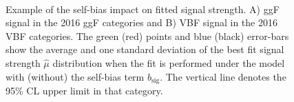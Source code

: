 \begin{figure}[ht!]
\captionsetup[subfigure]{justification=centering}
\centering
{}
\\
\caption[Example of the self-bias impact on fitted signal strength]{Example of the self-bias impact on fitted signal strength. A) ggF signal in the 2016 ggF categories and B) VBF signal in the 2016 VBF categories. The green (red) points and blue (black) error-bars show the average and one standard deviation of the best fit signal strength $\hat{\mu}$ distribution when the fit is performed under the model with (without) the self-bias term $b_\text{sig}$. The vertical line denotes the 95\% CL upper limit in that category.}
\label{fig:bkg:self-bias-mu}
\end{figure}

